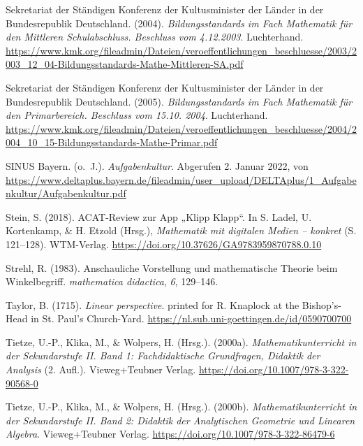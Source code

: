 \documentclass[
  ngerman,
]{scrbook}
\newlength{\cslhangindent}
\newlength{\cslentryspacingunit} %
\newenvironment{CSLReferences}[2] %
 {%
  \setlength{\parindent}{0pt}
  \ifodd #1
  \let\oldpar\par
  \def\par{\hangindent=\cslhangindent\oldpar}
  \fi
  \setlength{\parskip}{#2\cslentryspacingunit}
 }%
 {}
\theoremstyle{definition}
\theoremstyle{definition}
\theoremstyle{definition}
\theoremstyle{definition}
\theoremstyle{remark}
\begin{document}
\begin{CSLReferences}{1}{0}
\leavevmode{}%
Sekretariat der Ständigen Konferenz der Kultusminister der Länder in der Bundesrepublik Deutschland. (2004). \emph{Bildungsstandards im {Fach} {Mathematik} für den {Mittleren} {Schulabschluss}. {Beschluss} vom 4.12.2003}. Luchterhand. \url{https://www.kmk.org/fileadmin/Dateien/veroeffentlichungen_beschluesse/2003/2003_12_04-Bildungsstandards-Mathe-Mittleren-SA.pdf}

\leavevmode{}%
Sekretariat der Ständigen Konferenz der Kultusminister der Länder in der Bundesrepublik Deutschland. (2005). \emph{Bildungsstandards im {Fach} {Mathematik} für den {Primarbereich}. {Beschluss} vom 15.10. 2004}. Luchterhand. \url{https://www.kmk.org/fileadmin/Dateien/veroeffentlichungen_beschluesse/2004/2004_10_15-Bildungsstandards-Mathe-Primar.pdf}

\leavevmode{}%
SINUS Bayern. (o.~J.). \emph{Aufgabenkultur}. Abgerufen 2. Januar 2022, von \url{https://www.deltaplus.bayern.de/fileadmin/user_upload/DELTAplus/1_Aufgabenkultur/Aufgabenkultur.pdf}

\leavevmode{}%
Stein, S. (2018). {ACAT}-{Review} zur {App} „{Klipp} {Klapp}``. In S. Ladel, U. Kortenkamp, \& H. Etzold (Hrsg.), \emph{Mathematik mit digitalen {Medien} -- konkret} (S. 121--128). WTM-Verlag. \url{https://doi.org/10.37626/GA9783959870788.0.10}

\leavevmode{}%
Strehl, R. (1983). Anschauliche {Vorstellung} und mathematische {Theorie} beim {Winkelbegriff}. \emph{mathematica didactica}, \emph{6}, 129--146.

\leavevmode{}%
Taylor, B. (1715). \emph{Linear perspective}. printed for R. Knaplock at the Bishop's-Head in St. Paul's Church-Yard. \url{https://nl.sub.uni-goettingen.de/id/0590700700}

\leavevmode{}%
Tietze, U.-P., Klika, M., \& Wolpers, H. (Hrsg.). (2000a). \emph{Mathematikunterricht in der {Sekundarstufe} {II}. {Band} 1: {Fachdidaktische} {Grundfragen}, {Didaktik} der {Analysis}} (2. Aufl.). Vieweg+Teubner Verlag. \url{https://doi.org/10.1007/978-3-322-90568-0}

\leavevmode{}%
Tietze, U.-P., Klika, M., \& Wolpers, H. (Hrsg.). (2000b). \emph{Mathematikunterricht in der {Sekundarstufe} {II}. {Band} 2: {Didaktik} der {Analytischen} {Geometrie} und {Linearen} {Algebra}}. Vieweg+Teubner Verlag. \url{https://doi.org/10.1007/978-3-322-86479-6}


\end{CSLReferences}
\end{document}
